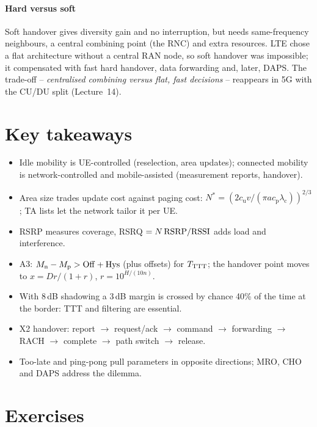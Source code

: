 \documentclass[11pt,a4paper]{article}
\begin{document}
\paragraph{Hard versus soft} Soft handover gives diversity gain and no interruption, but needs
same-frequency neighbours, a central combining point (the RNC) and extra resources. LTE chose a
flat architecture without a central RAN node, so soft handover was impossible; it compensated
with fast hard handover, data forwarding and, later, DAPS. The trade-off --
\emph{centralised combining versus flat, fast decisions} -- reappears in 5G with the CU/DU split
(Lecture~14).

\section{Key takeaways}
\begin{takeawaybox}
\begin{itemize}
  \item Idle mobility is UE-controlled (reselection, area updates); connected mobility is
        network-controlled and mobile-assisted (measurement reports, handover).
  \item Area size trades update cost against paging cost: $N^\ast = (2c_\mathrm{u}v/(\pi a c_\mathrm{p}\lambda_\mathrm{c}))^{2/3}$;
        TA lists let the network tailor it per UE.
  \item RSRP measures coverage, RSRQ $= N\,\mathrm{RSRP}/\mathrm{RSSI}$ adds load and interference.
  \item A3: $M_\mathrm{n} - M_\mathrm{p} > \mathrm{Off} + \mathrm{Hys}$ (plus offsets) for $T_{\mathrm{TTT}}$; the handover
        point moves to $x = Dr/(1+r)$, $r = 10^{H/(10n)}$.
  \item With 8\,dB shadowing a 3\,dB margin is crossed by chance 40\% of the time at the border:
        TTT and filtering are essential.
  \item X2 handover: report $\to$ request/ack $\to$ command $\to$ forwarding $\to$ RACH $\to$ complete
        $\to$ path switch $\to$ release.
  \item Too-late and ping-pong pull parameters in opposite directions; MRO, CHO and DAPS address
        the dilemma.
\end{itemize}
\end{takeawaybox}

\section{Exercises}
\end{document}
